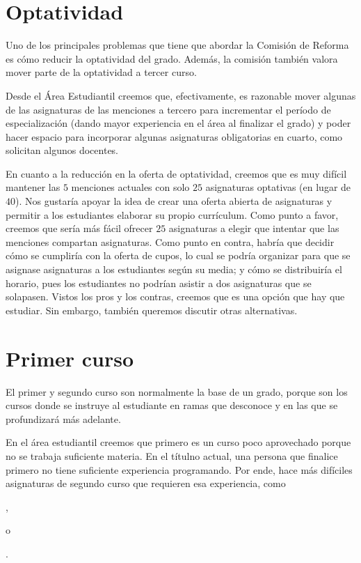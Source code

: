 
\section{Optatividad}

Uno de los principales problemas que tiene que abordar
la Comisión de Reforma
es cómo reducir la optatividad del grado. %
Además, la comisión también valora mover parte de la optatividad a tercer curso.

Desde el Área Estudiantil creemos que, efectivamente,
es razonable mover algunas de las asignaturas de las menciones a tercero para
incrementar el período de especialización
(dando mayor experiencia en el área al finalizar el grado)
y poder hacer espacio para
incorporar algunas asignaturas obligatorias en cuarto,
como solicitan algunos docentes.

En cuanto a la reducción en la oferta de optatividad,
creemos que es muy difícil mantener las $5$ menciones actuales
con solo $25$ asignaturas optativas (en lugar de $40$).
Nos gustaría apoyar la idea de crear una oferta abierta de asignaturas
y permitir a los estudiantes elaborar su propio currículum.
Como punto a favor, creemos que
sería más fácil ofrecer $25$ asignaturas a elegir
que intentar que las menciones compartan asignaturas.
Como punto en contra, habría que decidir
cómo se cumpliría con la oferta de cupos,
lo cual se podría organizar para que
se asignase asignaturas a los estudiantes según su media;
y cómo se distribuiría el horario,
pues los estudiantes no podrían asistir a dos asignaturas que se solapasen.
Vistos los pros y los contras, creemos que es una opción que hay que estudiar.
Sin embargo, también queremos discutir otras alternativas.

\section{Primer curso}\label{sec:approach-first-course}

El primer y segundo curso son normalmente la base de un grado,
porque son los cursos donde se instruye al estudiante en ramas que desconoce y
en las que se profundizará más adelante.

En el área estudiantil creemos que primero es un curso poco aprovechado
porque no se trabaja suficiente materia.
En el títulno actual, una persona que finalice primero
no tiene suficiente experiencia programando.
Por ende, hace más difíciles asignaturas de segundo curso
que requieren esa experiencia, como
\subject{Algoritmos y Estructuras de Datos},
\subject{Programación Orientada a Objetos} o
\subject{Programación Concurrente y Distribuida}.

